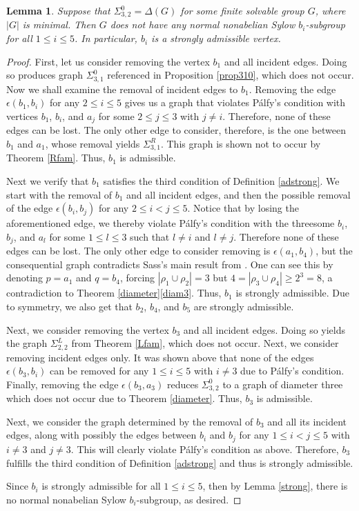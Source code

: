 \documentclass[11pt]{amsart}
\newtheorem{lemma}[theorem]{Lemma}
\theoremstyle{definition}
\theoremstyle{remark}
\numberwithin{equation}{section}
\newcommand{\SL}[2]{\Sigma_{#1,#2}^L} %
\newcommand{\SR}[2]{\Sigma_{#1,#2}^R} %
\newcommand{\SZ}[2]{\Sigma_{#1,#2}^0} %
\begin{document}
\begin{lemma}\label{lem32ad}
Suppose that $\SZ{3}{2}=\Delta(G)$ for some finite solvable group $G$, where $|G|$ is minimal. Then $G$ does not have any normal nonabelian Sylow $b_i$-subgroup for all $1\leq i\leq5$. In particular, $b_i$ is a strongly admissible vertex.
\end{lemma}
\begin{proof}
First, let us consider removing the vertex $b_1$ and all incident edges. Doing so produces graph $\SZ{3}{1}$ referenced in Proposition \ref{prop310}, which does not occur. Now we shall examine the removal of incident edges to $b_1$. Removing the edge $\epsilon(b_1,b_i)$ for any $2\leq i\leq5$ gives us a graph that violates P\'alfy's condition with vertices $b_1$, $b_i$, and $a_j$ for some $2\leq j\leq3$ with $j\neq i$. Therefore, none of these edges can be lost. The only other edge to consider, therefore, is the one between $b_1$ and $a_1$, whose removal yields $\SR{3}{1}$. This graph is shown not to occur by Theorem \ref{Rfam}. Thus, $b_1$ is admissible.

Next we verify that $b_1$ satisfies the third condition of Definition \ref{adstrong}. We start with the removal of $b_1$ and all incident edges, and then the possible removal of the edge $\epsilon(b_i,b_j)$ for any $2\leq i<j\leq5$. Notice that by losing the aforementioned edge, we thereby violate P\'alfy's condition with the threesome $b_i$, $b_j$, and $a_l$ for some $1\leq l\leq3$ such that $l\neq i$ and $l\neq j$. Therefore none of these edges can be lost. The only other edge to consider removing is $\epsilon(a_1,b_4)$, but the consequential graph contradicts Sass's main result from \cite{S}. One can see this by denoting $p=a_1$ and $q=b_4$, forcing $|\rho_1\cup\rho_2|=3$ but $4=|\rho_3\cup\rho_4|\geq2^3=8$, a contradiction to Theorem \ref{diameter}\eqref{diam3}. Thus, $b_1$ is strongly admissible. Due to symmetry, we also get that $b_2$, $b_4$, and $b_5$ are strongly admissible.

Next, we consider removing the vertex $b_3$ and all incident edges. Doing so yields the graph $\SL{2}{2}$ from Theorem \ref{Lfam}, which does not occur. Next, we consider removing incident edges only. It was shown above that none of the edges $\epsilon(b_3,b_i)$ can be removed for any $1\leq i\leq5$ with $i\neq3$ due to P\'alfy's condition. Finally, removing the edge $\epsilon(b_3,a_3)$ reduces $\SZ{3}{2}$ to a graph of diameter three which does not occur due to Theorem \ref{diameter}. Thus, $b_3$ is admissible.

Next, we consider the graph determined by the removal of $b_3$ and all its incident edges, along with possibly the edges between $b_i$ and $b_j$ for any $1\leq i<j\leq5$ with $i\neq3$ and $j\neq3$. This will clearly violate P\'alfy's condition as above. Therefore, $b_3$ fulfills the third condition of Definition \ref{adstrong} and thus is strongly admissible.

Since $b_i$ is strongly admissible for all $1\leq i\leq5$, then by Lemma \ref{strong}, there is no normal nonabelian Sylow $b_i$-subgroup, as desired.
\end{proof}
\end{document}
